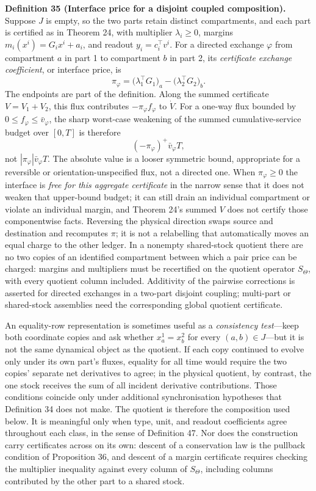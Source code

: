 \documentclass[11pt]{article}
\begin{document}
\textbf{Definition 35 (Interface price for a disjoint coupled composition).} Suppose \(J\) is empty, so the two parts retain distinct compartments, and each part is certified as in Theorem 24, with multiplier \(\lambda_i \ge 0\), margins \(m_i(x^i) = G_i x^i + a_i\), and readout \(y_i = c_i^{\top} v^i\). For a directed exchange \(\varphi\) from compartment \(a\) in part 1 to compartment \(b\) in part 2, its \emph{certificate exchange coefficient}, or interface price, is
\[
\pi_\varphi = \bigl(\lambda_1^{\top} G_1\bigr)_a - \bigl(\lambda_2^{\top} G_2\bigr)_b .
\]
The endpoints are part of the definition. Along the summed certificate \(V=V_1+V_2\), this flux contributes \(-\pi_\varphi f_\varphi\) to \(\dot V\). For a one-way flux bounded by \(0\le f_\varphi\le\bar v_\varphi\), the sharp worst-case weakening of the summed cumulative-service budget over \([0,T]\) is therefore
$$(-\pi_\varphi)^+\bar v_\varphi T,$$
not \(|\pi_\varphi|\bar v_\varphi T\). The absolute value is a looser symmetric bound, appropriate for a reversible or orientation-unspecified flux, not a directed one. When \(\pi_\varphi\ge0\) the interface is \emph{free for this aggregate certificate} in the narrow sense that it does not weaken that upper-bound budget; it can still drain an individual compartment or violate an individual margin, and Theorem 24's summed \(V\) does not certify those componentwise facts. Reversing the physical direction swaps source and destination and recomputes \(\pi\); it is not a relabelling that automatically moves an equal charge to the other ledger. In a nonempty shared-stock quotient there are no two copies of an identified compartment between which a pair price can be charged: margins and multipliers must be recertified on the quotient operator \(S_\Theta\), with every quotient column included. Additivity of the pairwise corrections is asserted for directed exchanges in a two-part disjoint coupling; multi-part or shared-stock assemblies need the corresponding global quotient certificate.

An equality-row representation is sometimes useful as a \emph{consistency test}---keep both coordinate copies and ask whether \(x_a^1=x_b^2\) for every \((a,b)\in J\)---but it is not the same dynamical object as the quotient. If each copy continued to evolve only under its own part's fluxes, equality for all time would require the two copies' separate net derivatives to agree; in the physical quotient, by contrast, the one stock receives the sum of all incident derivative contributions. Those conditions coincide only under additional synchronisation hypotheses that Definition 34 does not make. The quotient is therefore the composition used below. It is meaningful only when type, unit, and readout coefficients agree throughout each class, in the sense of Definition 47. Nor does the construction carry certificates across on its own: descent of a conservation law is the pullback condition of Proposition 36, and descent of a margin certificate requires checking the multiplier inequality against every column of \(S_\Theta\), including columns contributed by the other part to a shared stock.
\end{document}
